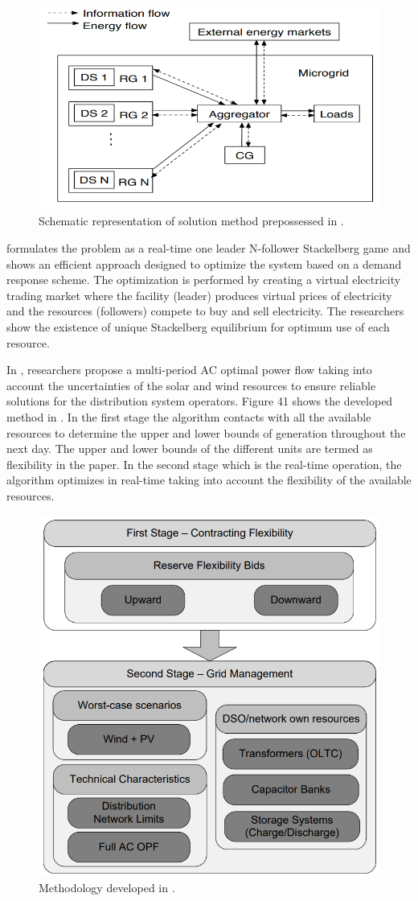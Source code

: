 \begin{figure}[!h]
\centering
\includegraphics[width=0.85\linewidth]{figs/RT_2.png}
\caption[Schematic representation of solution method prepossessed]{Schematic representation of solution method prepossessed in \cite{Sun14}.}
\label{fig:RT_2}
\end{figure}

\cite{Men16} formulates the problem as a real-time one leader N-follower Stackelberg game and shows an efficient approach designed to optimize the system based on a demand response scheme. The optimization is performed by creating a virtual electricity trading market where the facility (leader) produces virtual prices of electricity and the resources (followers) compete to buy and sell electricity. The researchers show the existence of unique Stackelberg equilibrium for optimum use of each resource.

In \cite{Tia17}, researchers propose a multi-period AC optimal power flow taking into account the uncertainties of the solar and wind resources to ensure reliable solutions for the distribution system operators. Figure 41 shows the developed method in \cite{Tia17}. In the first stage the algorithm contacts with all the available resources to determine the upper and lower bounds of generation throughout the next day. The upper and lower bounds of the different units are termed as flexibility in the paper. In the second stage which is the real-time operation, the algorithm optimizes in real-time taking into account the flexibility of the available resources. 
 
\begin{figure}[!h]
\centering
\includegraphics[width=0.5\linewidth]{figs/RT_3.png}
\caption[Methodology developed]{Methodology developed in \cite{Tia17}.}
\label{fig:RT_3}
\end{figure}

